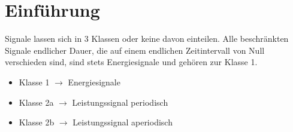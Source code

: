 \section{Einführung}
Signale lassen sich in 3 Klassen oder keine davon einteilen. Alle beschränkten Signale endlicher Dauer, die auf einem endlichen Zeitintervall von Null verschieden sind, sind stets Energiesignale und gehören zur Klasse 1. \\

\begin{itemize}[nosep]
	\item Klasse 1 $\rightarrow$ Energiesignale
	\item Klasse 2a $\rightarrow$ Leistungssignal periodisch
	\item Klasse 2b $\rightarrow$ Leistungssignal aperiodisch
\end{itemize} 

\begin{center}
\end{center}



